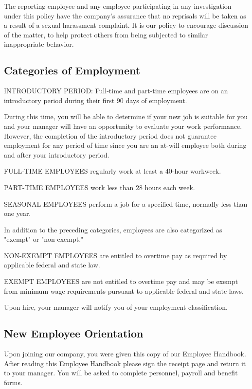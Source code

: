 \documentclass{book}
\begin{document}
The reporting employee and any employee participating in any investigation under this policy have the company's assurance that no reprisals will be taken as a result of a sexual harassment complaint. It is our policy to encourage discussion of the matter, to help protect others from being subjected to similar inappropriate behavior.

\subsection{Categories of Employment}

INTRODUCTORY PERIOD: Full-time and part-time employees are on an introductory period during their first 90 days of employment.

During this time, you will be able to determine if your new job is suitable for you and your manager will have an opportunity to evaluate your work performance. However, the completion of the introductory period does not guarantee employment for any period of time since you are an at-will employee both during and after your introductory period.

FULL-TIME EMPLOYEES regularly work at least a 40-hour workweek.

PART-TIME EMPLOYEES work less than 28 hours each week.

SEASONAL EMPLOYEES perform a job for a specified time, normally less than one year.

In addition to the preceding categories, employees are also categorized as "exempt" or "non-exempt."

NON-EXEMPT EMPLOYEES are entitled to overtime pay as required by applicable federal and state law.

EXEMPT EMPLOYEES are not entitled to overtime pay and may be exempt from minimum wage requirements pursuant to applicable federal and state laws.

Upon hire, your manager will notify you of your employment classification.

\subsection{New Employee Orientation}

Upon joining our company, you were given this copy of our Employee Handbook. After reading this Employee Handbook please sign the receipt page and return it to your manager. You will be asked to complete personnel, payroll and benefit forms.
\end{document}
